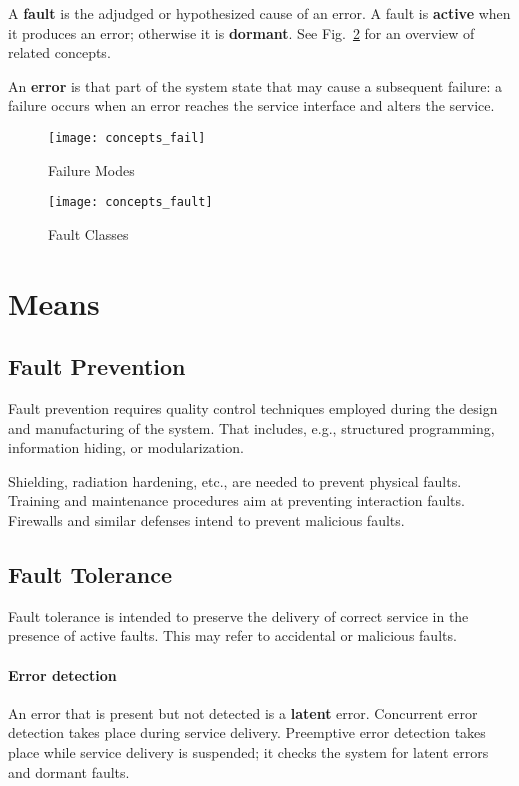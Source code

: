 A \textbf{fault} is the adjudged or hypothesized cause of an error.
A fault is \textbf{active} when it produces an error; otherwise it is \textbf{dormant}.
See Fig.~\ref{fig:concepts_fault} for an overview of related concepts.

An \textbf{error} is that part of the system state that may cause a subsequent failure: a failure occurs when an error reaches the service interface and alters the service.

\begin{figure}
\centering
\texttt{[image: concepts\_fail]}
\caption{Failure Modes}
\label{fig:concepts_fail}
\end{figure}

\begin{figure}
\centering
\texttt{[image: concepts\_fault]}
\caption{Fault Classes}
\label{fig:concepts_fault}
\end{figure}

\section{Means}

\subsection{Fault Prevention}

Fault prevention requires quality control techniques employed during the design and manufacturing of the system.
That includes, e.g., structured programming, information hiding, or modularization.

Shielding, radiation hardening, etc., are needed to prevent physical faults.
Training and maintenance procedures aim at preventing interaction faults.
Firewalls and similar defenses intend to prevent malicious faults.

\subsection{Fault Tolerance}

Fault tolerance is intended to preserve the delivery of correct service in the presence of active faults.
This may refer to accidental or malicious faults.

\paragraph{Error detection}
An error that is present but not detected is a \textbf{latent} error. 
Concurrent error detection takes place during service delivery.
Preemptive error detection takes place while service delivery is suspended; it checks the
system for latent errors and dormant faults.

